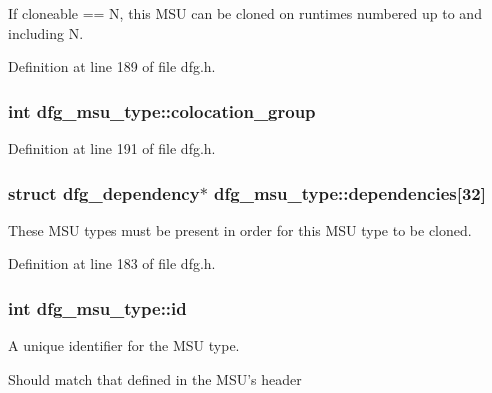 If cloneable == N, this M\-S\-U can be cloned on runtimes numbered up to and including N. 



Definition at line 189 of file dfg.\-h.

\hypertarget{structdfg__msu__type_ac40772c8600420c05ee16ff9ea527c95}{
\subsubsection[{colocation\-\_\-group}]{\setlength{\rightskip}{0pt plus 5cm}int dfg\-\_\-msu\-\_\-type\-::colocation\-\_\-group}}\label{structdfg__msu__type_ac40772c8600420c05ee16ff9ea527c95}


Definition at line 191 of file dfg.\-h.

\hypertarget{structdfg__msu__type_ae99af1194aeded6b89928e96dfb054d4}{
\subsubsection[{dependencies}]{\setlength{\rightskip}{0pt plus 5cm}struct {\bf dfg\-\_\-dependency}$\ast$ dfg\-\_\-msu\-\_\-type\-::dependencies\mbox{[}32\mbox{]}}}\label{structdfg__msu__type_ae99af1194aeded6b89928e96dfb054d4}


These M\-S\-U types must be present in order for this M\-S\-U type to be cloned. 



Definition at line 183 of file dfg.\-h.

\hypertarget{structdfg__msu__type_a25713ab319d35972ecb502b8c998d5c2}{
\subsubsection[{id}]{\setlength{\rightskip}{0pt plus 5cm}int dfg\-\_\-msu\-\_\-type\-::id}}\label{structdfg__msu__type_a25713ab319d35972ecb502b8c998d5c2}


A unique identifier for the M\-S\-U type. 

Should match that defined in the M\-S\-U's header 

